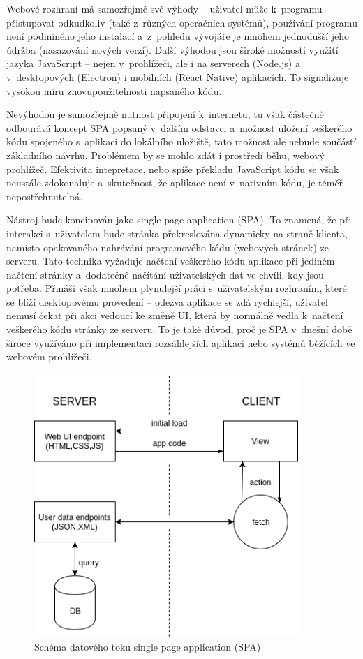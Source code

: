 Webové rozhraní má samozřejmě své výhody -- uživatel může k~programu přistupovat odkudkoliv (také z~různých operačních systémů), používání programu není podmíněno jeho instalací a~z~pohledu vývojáře je mnohem jednodušší jeho údržba (nasazování nových verzí). Další výhodou jsou široké možnosti využití jazyka JavaScript -- nejen v~prohlížeči, ale i na serverech (Node.js) a v~desktopových (Electron) i mobilních (React Native) aplikacích. To signalizuje vysokou míru znovupoužitelnosti napsaného kódu. 

Nevýhodou je samozřejmě nutnost připojení k~internetu, tu však částečně odbourává koncept SPA popsaný v~dalším odstavci a~možnost uložení veškerého kódu spojeného s~aplikací do lokálního uložiště, tato možnost ale nebude součástí základního návrhu. Problémem by se mohlo zdát i prostředí běhu, webový prohlížeč. Efektivita intepretace, nebo spíše překladu JavaScript kódu se však neustále zdokonaluje a~skutečnost, že aplikace není v~nativním kódu, je téměř nepostřehnutelná. 

Nástroj bude koncipován jako single page application (SPA). To znamená, že při interakci s~uživatelem bude stránka překreslována dynamicky na straně klienta, namísto opakovaného nahrávání programového kódu (webových stránek) ze serveru. Tato technika vyžaduje načtení veškerého kódu aplikace při jediném načtení stránky a~dodatečné načítání uživatelských dat ve chvíli, kdy jsou potřeba. Přináší však mnohem plynulejší práci s~uživatelským rozhraním, které se blíží desktopovému provedení -- odezva aplikace se zdá rychlejší, uživatel nemusí čekat při akci vedoucí ke změně UI, která by normálně vedla k~načtení veškerého kódu stránky ze serveru. To je také důvod, proč je SPA v~dnešní době široce využíváno při implementaci rozsáhlejších aplikací nebo systémů běžících ve webovém prohlížeči. 


\begin{figure}
  \centering
  \includegraphics[width=10cm]{img/spa.png}
  \caption{Schéma datového toku single page application (SPA)}
\end{figure}


